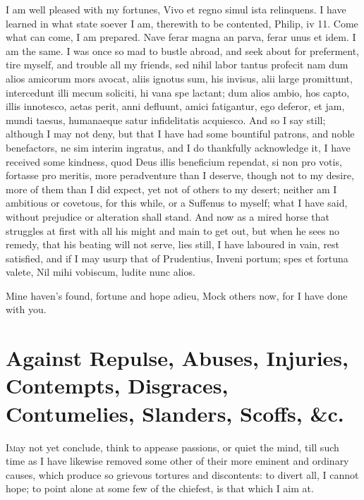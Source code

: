 {I am well pleased with my fortunes, Vivo et regno simul ista
relinquens.
I have learned in what state soever I am, therewith to be contented,
Philip, iv 11. Come what can come, I am prepared. Nave ferar magna an
parva, ferar unus et idem. I am the same. I was once so mad to bustle
abroad, and seek about for preferment, tire myself, and trouble all my
friends, sed nihil labor tantus profecit nam dum alios amicorum mors
avocat, aliis ignotus sum, his invisus, alii large promittunt,
intercedunt illi mecum soliciti, hi vana spe lactant; dum alios ambio,
hos capto, illis innotesco, aetas perit, anni defluunt, amici
fatigantur, ego deferor, et jam, mundi taesus, humanaeque satur
infidelitatis acquiesco. And so I say still; although I may not
deny, but that I have had some  bountiful patrons, and noble
benefactors, ne sim interim ingratus, and I do thankfully acknowledge
it, I have received some kindness, quod Deus illis beneficium rependat,
si non pro votis, fortasse pro meritis, more peradventure than I
deserve, though not to my desire, more of them than I did expect, yet
not of others to my desert; neither am I ambitious or covetous, for
this while, or a Suffenus to myself; what I have said, without
prejudice or alteration shall stand. And now as a mired horse that
struggles at first with all his might and main to get out, but when he
sees no remedy, that his beating will not serve, lies still, I have
laboured in vain, rest satisfied, and if I may usurp that of
Prudentius,
Inveni portum; spes et fortuna valete,
Nil mihi vobiscum, ludite nunc alios.

Mine haven's found, fortune and hope adieu,
Mock others now, for I have done with you.



\section[Against Repulse, Abuses, Injuries \ldots{}]{Against Repulse, Abuses, Injuries, Contempts, Disgraces, Contumelies, Slanders, Scoffs, \&c.}

\lettrine{I} may not yet conclude, think to appease passions, or quiet the mind,
till such time as I have likewise removed some other of their more
eminent and ordinary causes, which produce so grievous tortures and
discontents: to divert all, I cannot hope; to point alone at some few
of the chiefest, is that which I aim at.
}
